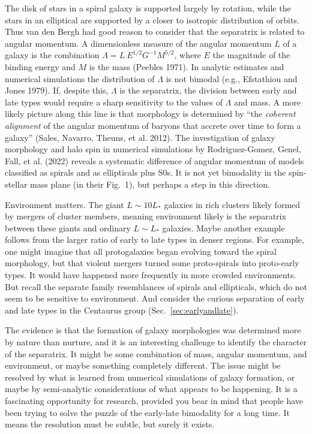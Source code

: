 \documentclass[fleqn,usenatbib]{mnras}
\begin{document}
The disk of stars in a spiral galaxy is supported largely by rotation, while the stars in an elliptical are supported by a closer to isotropic distribution of orbits. Thus van den Bergh had good reason to consider that the separatrix is related to angular momentum. A dimensionless measure of the angular momentum $L$ of a galaxy is the combination $\Lambda = L~E^{1/2}G^{-1}M^{5/2}$, where $E$ the magnitude of the binding energy and $M$ is the mass (Peebles 1971). In analytic estimates and numerical simulations the distribution of $\Lambda$ is not bimodal (e.g., Efstathiou and Jones 1979). If, despite this, $\Lambda$ is the separatrix, the division between early and late types would require a sharp sensitivity to the values of $\Lambda$ and mass. A more likely picture along this line is that morphology is determined by ``the {\it coherent alignment} of the angular momentum of baryons that accrete over time to form a galaxy'' (Sales, Navarro, Theuns, et al. 2012). The investigation of galaxy morphology and halo spin in numerical simulations by Rodriguez-Gomez, Genel, Fall, et al. (2022) reveals a systematic difference of angular momentum of models classified as spirals and as ellipticals plus S0s. It is not yet bimodality in the spin-stellar mass plane (in their Fig.~1), but perhaps a step in this direction.

Environment matters. The giant $L\sim 10L_\ast$ galaxies in rich clusters likely formed by mergers of cluster members, meaning environment likely is the separatrix between these giants and ordinary $L\sim L_\ast$ galaxies. Maybe another example follows from the larger ratio of early to late types  in denser regions. For example, one might imagine that all protogalaxies began evolving toward the spiral morphology, but that violent mergers turned some proto-spirals into proto-early types. It would have happened more frequently in more crowded environments. But recall the separate family resemblances of spirals and ellipticals, which do not seem to be sensitive to environment. And consider the curious separation of early and late types in the Centaurus group (Sec.~\ref{sec:earlyandlate}).

The evidence is that the formation of galaxy morphologies was determined more by nature than nurture, and it is an interesting challenge to identify the character of the  separatrix. It might be some combination of mass, angular momentum, and environment, or maybe something completely different. The issue might be resolved by what is learned from numerical simulations of galaxy formation, or maybe by semi-analytic considerations of what appears to be happening. It is a fascinating opportunity for research, provided you bear in mind that people have been trying to solve the puzzle of the early-late bimodality for a long time. It means the resolution must be subtle, but surely it exists.
\end{document}
